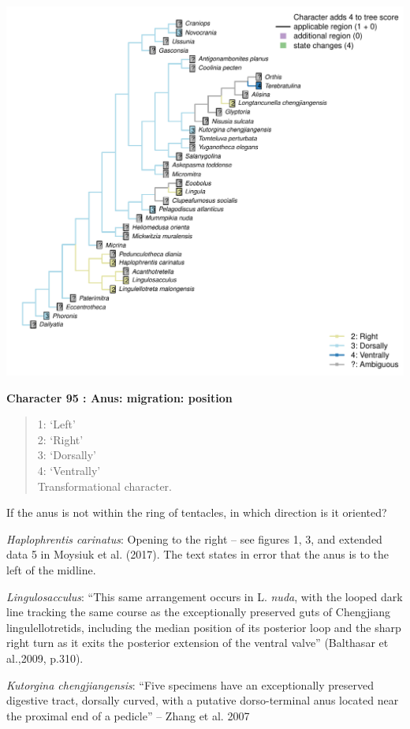 \documentclass[]{book}
\theoremstyle{definition}
\theoremstyle{definition}
\theoremstyle{definition}
\theoremstyle{remark}
\begin{document}
\includegraphics{Brachiopod_phylogeny_files/figure-latex/unnamed-chunk-5-95.pdf}

\textbf{Character 95 : Anus: migration: position }

\begin{quote}
1: `Left'\\
2: `Right'\\
3: `Dorsally'\\
4: `Ventrally'\\
Transformational character.
\end{quote}

If the anus is not within the ring of tentacles, in which direction is
it oriented?

\emph{Haplophrentis carinatus}: Opening to the right -- see figures 1,
3, and extended data 5 in Moysiuk et al. (2017). The text states in
error that the anus is to the left of the midline.

\emph{Lingulosacculus}: ``This same arrangement occurs in L.
\emph{nuda}, with the looped dark line tracking the same course as the
exceptionally preserved guts of Chengjiang lingulellotretids, including
the median position of its posterior loop and the sharp right turn as it
exits the posterior extension of the ventral valve'' (Balthasar et
al.,2009, p.310).

\emph{Kutorgina chengjiangensis}: ``Five specimens have an exceptionally
preserved digestive tract, dorsally curved, with a putative
dorso-terminal anus located near the proximal end of a pedicle'' --
Zhang et al. 2007
\end{document}
